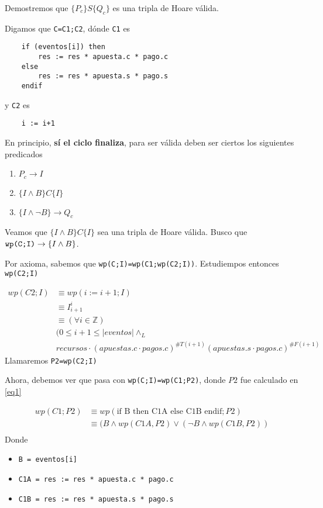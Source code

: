\documentclass[../document.tex]{subfiles}
\begin{document}
Demostremos que $\{P_c\}S\{Q_c\}$ es una tripla de Hoare válida.

Digamos que \verb+C=C1;C2+, dónde \verb+C1+ es
\begin{verbatim}
    if (eventos[i]) then
        res := res * apuesta.c * pago.c
    else
        res := res * apuesta.s * pago.s
    endif
\end{verbatim}

y \verb+C2+ es
\begin{verbatim}
    i := i+1
\end{verbatim}

En principio, \textbf{sí el ciclo finaliza}, para ser válida deben ser ciertos los siguientes predicados
\begin{enumerate}
    \item $P_c \to I$
    \item $\{I \land B\}C\{I\}$
    \item $\{I \land \neg B\} \to Q_c$
\end{enumerate}

Veamos que $\{I \land B\}C\{I\}$ sea una tripla de Hoare válida. Busco que $\verb+wp(C;I)+ \to \{I \land B\}$.

Por axioma, sabemos que \verb+wp(C;I)=wp(C1;wp(C2;I))+. Estudiempos entonces \verb|wp(C2;I)|

\begin{equation} \label{eq1}
\begin{split}
wp(C2;I) & \equiv wp(i := i+1;I) \\
         & \equiv I^{i}_{i+1} \\
         & \equiv (\forall i \in \mathbb{Z})\\
         &(0\leq i+1 \leq |eventos| \land_L\\ 
         &recursos \cdot (apuestas.c\cdot pagos.c)^{\#T(i+1)}(apuestas.s\cdot pagos.c)^{\#F(i+1)}
\end{split}
\end{equation}
Llamaremos \verb|P2=wp(C2;I)|

Ahora, debemos ver que pasa con \verb+wp(C;I)=wp(C1;P2)+, donde $P2$ fue calculado en \ref{eq1}

\begin{equation} \label{eq2}
\begin{split}
wp(C1;P2) & \equiv wp(\text{if B then C1A else C1B endif};P2) \\
          & \equiv (B \land wp(C1A, P2) \lor (\neg B \land wp(C1B, P2)) \\
\end{split}
\end{equation}
Donde
\begin{itemize}
    \item \verb|B = eventos[i]|
    \item \verb|C1A = res := res * apuesta.c * pago.c|
    \item \verb|C1B = res := res * apuesta.s * pago.s|
\end{itemize}
\end{document}
